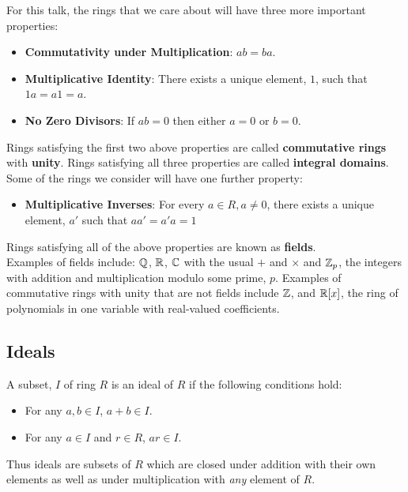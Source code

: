 \documentclass[twoside]{report}
\begin{document}
\bigskip For this talk, the rings that we care about will have three
more important properties:

\begin{itemize}
\item \textbf{Commutativity under Multiplication}: $ab = ba$.
\item \textbf{Multiplicative Identity}: There exists a unique
  element, $1$, such that $1a = a1 = a$.
\item \textbf{No Zero Divisors}: If $ab = 0$ then either $a = 0$ or $b
  = 0$.
\end{itemize}

Rings satisfying the first two above properties are called
\textbf{commutative rings} with \textbf{unity}.  Rings satisfying all
three properties are called \textbf{integral domains}.\\

Some of the rings we consider will have one further property:

\begin{itemize}
\item \textbf{Multiplicative Inverses}: For every $a \in R, a \neq 0$, there
  exists a unique element, $a'$ such that $aa' = a'a = 1$
\end{itemize}

Rings satisfying all of the above properties are known as
\textbf{fields}.\\

Examples of fields include: $\mathbb{Q}$, $\mathbb{R}$, $\mathbb{C}$ with
the usual $+$ and $\times$ and $\mathbb{Z}_p$, the integers with
addition and multiplication modulo some prime, $p$. Examples of
commutative rings with unity that are not fields include $\mathbb{Z}$,
and $\mathbb{R}[x]$, the ring of polynomials in one variable with
real-valued coefficients.

\subsection{Ideals}

A subset, $I$ of ring $R$ is an ideal of $R$ if the following conditions hold:

\begin{itemize}
\item For any $a, b \in I$, $a + b \in I$.
\item For any $a \in I$ and $r \in R$, $ar \in I$.
\end{itemize}

Thus ideals are subsets of $R$ which are closed under addition with
their own elements as well as under multiplication with \textit{any}
element of $R$.\\
\end{document}
